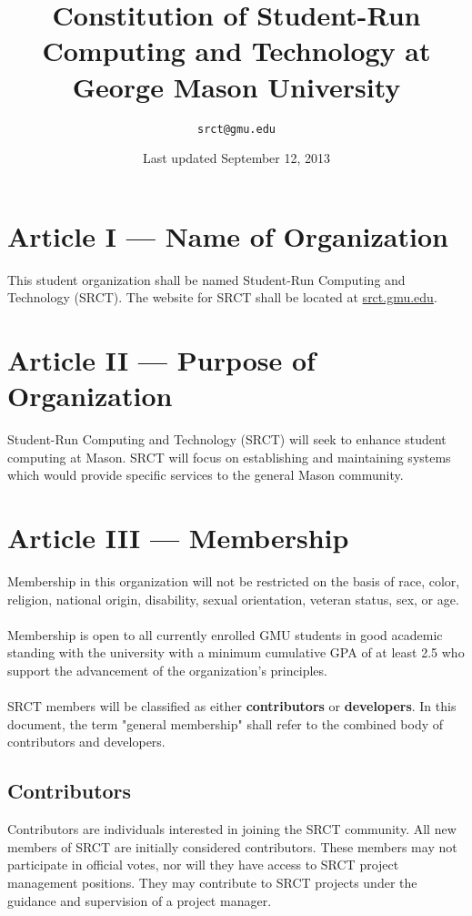 \documentclass{article}
\title{\bfseries Constitution of Student-Run Computing and Technology at 
George Mason University}
\date{Last updated September 12, 2013}
\author{\texttt{srct@gmu.edu}}
\begin{document}
  
  \maketitle
  
  \section{Article I --- Name of Organization}
  This student organization shall be named Student-Run Computing and 
  Technology (SRCT). The website for SRCT shall be located at 
  \url{srct.gmu.edu}.
  
  \section{Article II --- Purpose of Organization}
  Student-Run Computing and Technology (SRCT) will seek to enhance 
  student computing at Mason. SRCT will focus on establishing and 
  maintaining systems which would provide specific services to the 
  general Mason community.
  
  \section{Article III --- Membership}
  Membership in this organization will not be restricted on the basis of 
  race, color, religion, national origin, disability, sexual 
  orientation, veteran status, sex, or age. 
  \\ \\
  Membership is open to all currently enrolled GMU students in good 
  academic standing with the university with a minimum cumulative GPA of 
  at least 2.5 who support the advancement of the organization's 
  principles.
  \\ \\
  SRCT members will be classified as either \textbf{contributors} or 
  \textbf{developers}. In this document, the term "general membership"
  shall refer to the combined body of contributors and developers.
  
  \subsection{Contributors}
  Contributors are individuals interested in joining the SRCT community. 
  All new members of SRCT are initially considered contributors. These 
  members may not participate in official votes, nor will they have 
  access to SRCT project management positions. They may contribute to 
  SRCT projects under the guidance and supervision of a project 
  manager.
  
\end{document}
